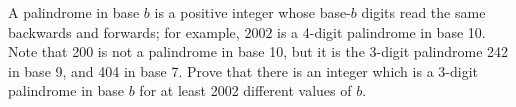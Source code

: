 A palindrome in base $b$ is a positive integer whose base-$b$
digits read the same backwards and forwards; for example,
$2002$ is a 4-digit palindrome in base 10. Note that 200 is not
a palindrome in base 10, but it is the 3-digit palindrome
242 in base 9, and 404 in base 7. Prove that there is an integer
which is a 3-digit palindrome in base $b$ for at least 2002
different values of $b$.

